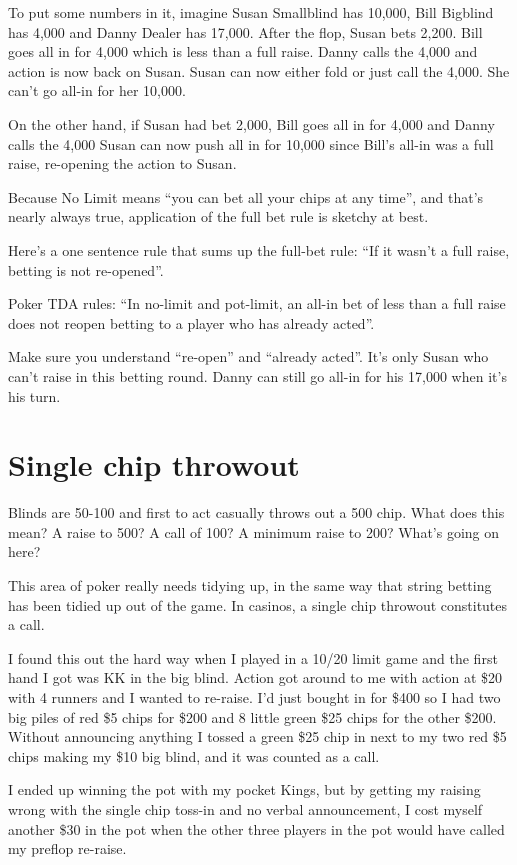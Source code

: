 To put some numbers in it, imagine Susan Smallblind has 10,000,
Bill Bigblind has 4,000 and Danny Dealer has 17,000. After the flop, 
Susan bets 2,200. Bill goes all in for 4,000 which is less
than a full raise. Danny calls the 4,000 and action is now back on Susan.
Susan can now either fold or just call the 4,000. She can't go all-in 
for her 10,000.

On the other hand, if Susan had bet 2,000, Bill goes all in for 4,000
and Danny calls the 4,000 Susan can now push all in for 10,000 since
Bill's all-in was a full raise, re-opening the action to Susan.

Because No Limit means ``you can bet all your chips at any time'', and
that's nearly always true, application of the full bet rule is sketchy
at best.

Here's a one sentence rule that sums up the full-bet rule:
``If it wasn't a full raise, betting is not re-opened''.

Poker TDA rules: ``In no-limit and pot-limit, an all-in bet of less
than a full raise does not reopen betting to a player who has already
acted''.

Make sure you understand ``re-open'' and ``already acted''. It's only
Susan who can't raise in this betting round. Danny can still go all-in for
his 17,000 when it's his turn.

\section{Single chip throwout}

Blinds are 50-100 and first to act casually throws out a 500 chip.
What does this mean? A raise to 500? A call of 100? A minimum raise
to 200? What's going on here?

This area of poker really needs tidying up, in the same way that
string betting has been tidied up out of the game. In casinos, a
single chip throwout constitutes a call.

I found this out the hard way when I played in a 10/20 limit game
and the first hand I got was KK in the big blind. Action got around
to me with action at \$20 with 4 runners and I wanted to re-raise. I'd
just bought in for \$400 so I had two big piles of red \$5 chips
for \$200 and 8 little green \$25 chips for the other \$200. Without
announcing anything I tossed a green \$25 chip in next to my two red
\$5 chips making my \$10 big blind, and it was counted as a call.

I ended up winning the pot with my pocket Kings, but by getting my
raising wrong with the single chip toss-in and no verbal announcement,
I cost myself another \$30 in the pot when the other three players
in the pot would have called my preflop re-raise.

